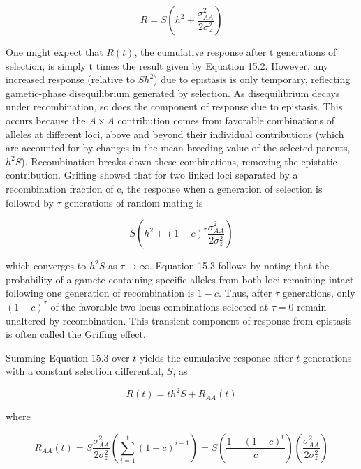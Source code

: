 \documentclass{article}
\begin{document}
\begin{equation}
R=S\left(h^{2}+\frac{\sigma_{AA}^{2}}{2\sigma_{z}^{2}}\right)
\tag{15.2}
\label{eq:15_2}
\end{equation}

One might expect that  $ R(t) $, the cumulative response after t generations of selection, is simply t times the result given by Equation 15.2. However, any increased response (relative to  $ Sh^{2} $) due to epistasis is only temporary, reflecting gametic-phase disequilibrium generated by selection. As disequilibrium decays under recombination, so does the component of response due to epistasis. This occurs because the  $ A \times A $ contribution comes from favorable combinations of alleles at different loci, above and beyond their individual contributions (which are accounted for by changes in the mean breeding value of the selected parents,  $ h^{2}S $). Recombination breaks down these combinations, removing the epistatic contribution. Griffing showed that for two linked loci separated by a recombination fraction of c, the response when a generation of selection is followed by  $ \tau $ generations of random mating is

\begin{equation}
S\left(h^{2}+(1-c)^{\tau}\frac{\sigma_{A A}^{2}}{2\sigma_{z}^{2}}\right)
\tag{15.3}
\label{eq:15_3}
\end{equation}

which converges to  $ h^2S $ as  $ \tau \to \infty $. Equation 15.3 follows by noting that the probability of a gamete containing specific alleles from both loci remaining intact following one generation of recombination is  $ 1 - c $. Thus, after  $ \tau $ generations, only  $ (1 - c)^{\tau} $ of the favorable two-locus combinations selected at  $ \tau = 0 $ remain unaltered by recombination. This transient component of response from epistasis is often called the Griffing effect.

Summing Equation 15.3 over  $ t $ yields the cumulative response after  $ t $ generations with a constant selection differential,  $ S $, as

\begin{equation}
R(t)=t h^{2}S+R_{A A}(t)
\tag{15.4a}
\label{eq:15_4a}
\end{equation}

where

\begin{equation}
R_{A A}(t)=S\frac{\sigma_{A A}^{2}}{2\sigma_{z}^{2}}\left(\sum_{i=1}^{t}(1-c)^{i-1}\right)=S\left(\frac{1-(1-c)^{t}}{c}\right)\left(\frac{\sigma_{A A}^{2}}{2\sigma_{z}^{2}}\right)
\tag{15.4b}
\label{eq:15_4b}
\end{equation}
\end{document}
